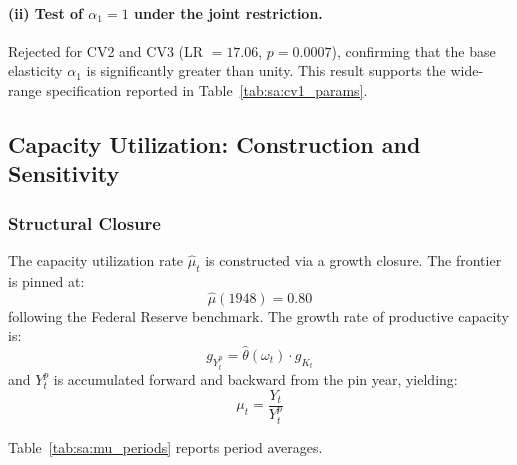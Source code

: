 \paragraph{(ii) Test of $\alpha_1 = 1$ under the joint restriction.}
Rejected for CV2 and CV3 (LR $= 17.06$, $p = 0.0007$), confirming that
the base elasticity $\alpha_1$ is significantly greater than unity. This
result supports the wide-range specification reported in
Table~\ref{tab:sa:cv1_params}.


\subsection{Capacity Utilization: Construction and Sensitivity}
\label{app:sa:mu_construction}

\subsubsection{Structural Closure}
\label{app:sa:mu_structural}

The capacity utilization rate $\hat{\mu}_t$ is constructed via a growth
closure. The frontier is pinned at:
%
\begin{equation}
    \hat{\mu}(1948) = 0.80
    \label{eq:sa:mu_pin}
\end{equation}
%
following the Federal Reserve benchmark. The growth rate of productive
capacity is:
%
\begin{equation}
    g_{Y^p_t} = \hat{\theta}(\omega_t) \cdot g_{K_t}
    \label{eq:sa:frontier_growth}
\end{equation}
%
and $Y^p_t$ is accumulated forward and backward from the pin year, yielding:
%
\begin{equation}
   \mu_t = \frac{Y_t}{Y^p_t}
    \label{eq:sa:mu_def}
\end{equation}

Table~\ref{tab:sa:mu_periods} reports period averages.

